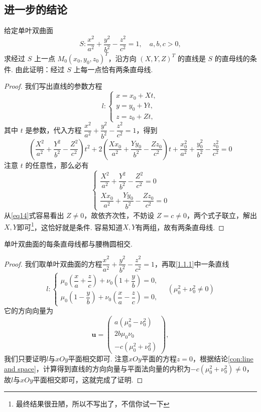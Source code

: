 \documentclass[12pt, a4paper,newtx]{ctexart}
\begin{document}
\subsection{进一步的结论}
\begin{property}{}{}
	给定单叶双曲面
	\[
	S \colon \frac{x^2}{a^2} + \frac{y^2}{b^2} - \frac{z^2}{c^2} = 1, \quad a, b, c > 0,
	\]
	求经过 $S$ 上一点 $M_0(x_0, y_0, z_0)^T$，沿方向 $(X, Y, Z)^T$ 的直线是 $S$ 的直母线的条件. 由此证明：经过 $S$ 上每一点恰有两条直母线. 
\end{property}
\begin{proof}
	我们写出直线的参数方程
	\begin{equation}\label{eq14}
		l : \begin{cases}
			x = x_0 + Xt, \\
			y = y_0 + Yt, \\
			z = z_0 + Zt,
		\end{cases}
	\end{equation}
	其中 $t$ 是参数，代入方程 $\dfrac{x^2}{a^2} + \dfrac{y^2}{b^2} - \dfrac{z^2}{c^2} = 1$，得到
	\[
	\left( \frac{X^2}{a^2} + \frac{Y^2}{b^2} - \frac{Z^2}{c^2} \right) t^2 + 2 \left( \frac{Xx_0}{a^2} + \frac{Yy_0}{b^2} - \frac{Zz_0}{c^2} \right) t + \frac{x_0^2}{a^2} + \frac{y_0^2}{b^2} - \frac{z_0^2}{c^2} = 0
	\]
	注意 $t$ 的任意性，那么必有
	\[
	\begin{cases}
		\dfrac{X^2}{a^2} + \dfrac{Y^2}{b^2} - \dfrac{Z^2}{c^2} = 0 \\
		\dfrac{Xx_0}{a^2} + \dfrac{Yy_0}{b^2} - \dfrac{Zz_0}{c^2} = 0
	\end{cases}
	\]
	从\eqref{eq14}式容易看出 $Z \neq 0$，故依齐次性，不妨设 $Z = c \neq 0$，两个式子联立，解出$X,Y$即可\footnote{最终结果很丑陋，所以不写出了，不信你试一下}，这恰好就是条件. 容易知道$X,Y$有两组，故有两条直母线. 
\end{proof}
\begin{property}{}{}
	单叶双曲面的每条直母线都与腰椭圆相交. 
\end{property}
\begin{proof}
	我们取单叶双曲面的方程$\dfrac{x^2}{a^2} + \dfrac{y^2}{b^2} - \dfrac{z^2}{c^2} = 1$，再取\eqref{1.1.1}中一条直线\[l:\begin{cases}
		\mu_0\left(\dfrac{x}a+\dfrac{z}{c}\right)+\nu_0\left(1+\dfrac{y}{b}\right)=0,\\\mu_0\left(1-\dfrac{y}{b}\right)+\nu_0\left(\dfrac{x}a-\dfrac{z}{c}\right)=0,
	\end{cases}\quad\left(\mu_0^2+\nu_0^2\ne0\right)\]
	它的方向向量为\[\bm u=\begin{pmatrix}
		a(\mu_0^2 - \nu_0^2)\\2b\mu_0\nu_0\\-c(\mu_0^2 + \nu_0^2)
	\end{pmatrix}
	,\]我们只要证明$l$与$xOy$平面相交即可. 注意$xOy$平面的方程$z=0$，根据结论\ref{con:line and space}，计算得到直线的方向向量与平面法向量的内积为$-c(\mu_0^2+\nu_0^2)\ne0$，故$l$与$xOy$平面相交即可，这就完成了证明. 
\end{proof}
\end{document}
